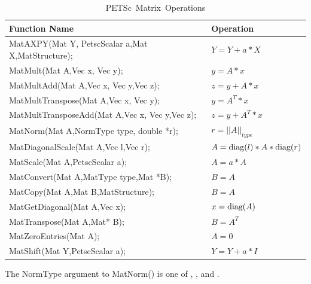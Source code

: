 \begin{table}[tb]
\begin{center}
\begin{tabular}{ll}
{\bf Function Name} & {\bf Operation} \\
\hline
MatAXPY(Mat Y, PetscScalar a,Mat X,MatStructure); & $ Y = Y + a*X $ \\
MatMult(Mat A,Vec x, Vec y); & $ y = A*x $ \\
MatMultAdd(Mat A,Vec x, Vec y,Vec z); & $ z = y + A*x $ \\
MatMultTranspose(Mat A,Vec x, Vec y); & $ y = A^{T}*x $ \\
MatMultTransposeAdd(Mat A,Vec x, Vec y,Vec z); & $ z = y + A^{T}*x $ \\
MatNorm(Mat A,NormType type,  double *r); & $ r = ||A||_{type}$ \\
MatDiagonalScale(Mat A,Vec l,Vec r); & $ A = \hbox{diag}(l)*A*\hbox{diag}(r) $ \\
MatScale(Mat A,PetscScalar a); & $ A = a*A $ \\
MatConvert(Mat A,MatType type,Mat *B); & $ B = A $ \\
MatCopy(Mat A,Mat B,MatStructure); &  $ B = A $ \\
MatGetDiagonal(Mat A,Vec x); & $ x = \hbox{diag}(A)$ \\
MatTranspose(Mat A,Mat* B); & $ B = A^{T} $ \\
MatZeroEntries(Mat A); & $ A = 0 $ \\
MatShift(Mat Y,PetscScalar a); & $ Y =  Y + a*I $ \\
\hline 
\end{tabular}
\end{center}
\caption{\hbox{PETSc Matrix Operations}}
\label{fig_matrixops}
\end{table}
The NormType argument to MatNorm() is one of 
 , , and .
   
  
